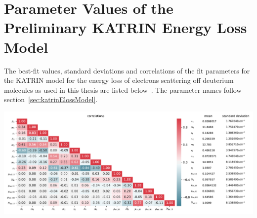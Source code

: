 \section{Parameter Values of the Preliminary KATRIN Energy Loss Model}
\label{sec:appendixKatrinElossElossModelParams}
The best-fit values, standard deviations and correlations of the fit parameters for the KATRIN model for the energy loss of electrons scattering off deuterium molecules as used in this thesis are listed below~\cite{Hannen2019_1}. The parameter names follow section~\ref{sec:katrinElossModel}.

\includegraphics[width=\textwidth]{chapter/sensitivityStudyWithPreliminaryKatrinElossModel/appendix/fig/katrinElossParamValues.pdf}
\clearpage

